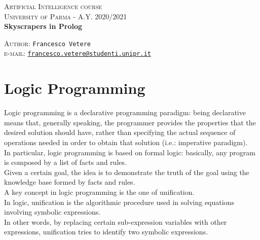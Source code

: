 \documentclass{article}
\date{}
\begin{document}
\begin{titlepage}
  \begin{center}
     \Large\textsc{Artificial Intelligence course\\University of Parma - A.Y. 2020/2021}\\
     \vspace{1cm}
     \Large\textbf{Skyscrapers in Prolog}\\
     \vspace{1cm}
     
      \large{\textsc{Author}: \texttt{Francesco Vetere}\\ \small \textsc{e-mail:} \href{mailto:francesco.vetere@studenti.unipr.it}{\texttt{francesco.vetere@studenti.unipr.it}} }
  \end{center}
\end{titlepage}

\pagebreak


\section{Logic Programming}
Logic programming is a declarative programming paradigm: being declarative means that, generally speaking, the programmer provides the properties that the desired solution should have, rather than specifying the actual sequence of operations needed in order to obtain that solution (i.e.: imperative paradigm).\\

In particular, logic programming is based on formal logic: basically, any program is composed by
a list of facts and rules.\\
Given a certain goal, the idea is to demonstrate the truth of the goal using the knowledge base formed by facts and rules.\\

A key concept in logic programming is the one of unification.\\

In logic, unification is the algorithmic procedure used in solving equations involving symbolic expressions.\\
In other words, by replacing certain sub-expression variables with other expressions, unification tries to identify two symbolic expressions.\\
\end{document}
